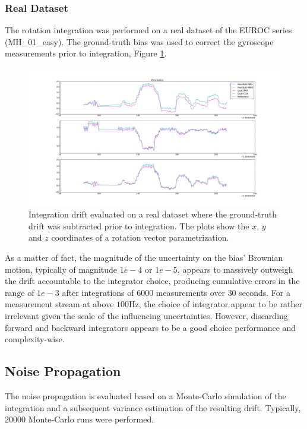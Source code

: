 \documentclass[10pt,a4paper]{article}
\numberwithin{equation}{section}
\begin{document}
\subsubsection{Real Dataset}

The rotation integration was performed on a real dataset of the EUROC series (MH\_01\_easy).
The ground-truth bias was used to correct the gyroscope measurements prior to integration, Figure \ref{fig:rotation_drift_real}.

\begin{figure}
\includegraphics[width=14cm]{figures/rotation_drift_real.pdf}
\caption{Integration drift evaluated on a real dataset where the ground-truth drift was subtracted prior to integration. The plots show the $x$, $y$ and $z$ coordinates of a rotation vector parametrization.}
\label{fig:rotation_drift_real}
\end{figure}	

As a matter of fact, the magnitude of the uncertainty on the bias' Brownian motion, typically of magnitude $1e-4$ or $1e-5$, appears to massively outweigh the drift accountable to the integrator choice, producing cumulative errors in the range of $1e-3$ after integrations of $6000$ measurements over $30$ seconds.
For a measurement stream at above $100$Hz, the choice of integrator appear to be rather irrelevant given the scale of the influencing uncertainties.
However, discarding forward and backward integrators appears to be a good choice performance and complexity-wise.

\subsection{Noise Propagation}
The noise propagation is evaluated based on a Monte-Carlo simulation of the integration and a subsequent variance estimation of the resulting drift. Typically, $20 000$ Monte-Carlo runs were performed.
\end{document}
